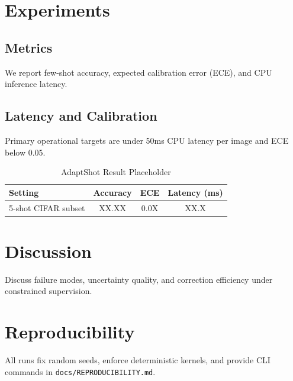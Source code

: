 \documentclass[11pt]{article}
\begin{document}
\section{Experiments}
\subsection{Metrics}
We report few-shot accuracy, expected calibration error (ECE), and CPU inference latency.

\subsection{Latency and Calibration}
Primary operational targets are under 50ms CPU latency per image and ECE below 0.05.

\begin{table}[h]
\centering
\caption{AdaptShot Result Placeholder}
\begin{tabular}{lccc}
\toprule
Setting & Accuracy & ECE & Latency (ms) \\
\midrule
5-shot CIFAR subset & XX.XX & 0.0X & XX.X \\
\bottomrule
\end{tabular}
\end{table}

\section{Discussion}
Discuss failure modes, uncertainty quality, and correction efficiency under constrained supervision.

\section{Reproducibility}
All runs fix random seeds, enforce deterministic kernels, and provide CLI commands in \texttt{docs/REPRODUCIBILITY.md}.
\end{document}
